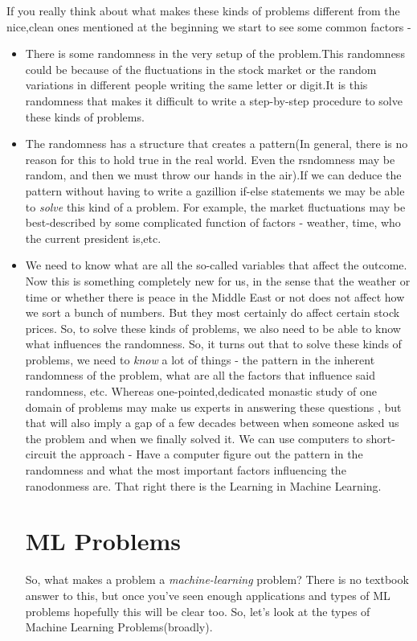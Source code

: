 \documentclass[]{article}
\begin{document}
\begin{itemize}
		If you really think about what makes these kinds of problems different from the nice,clean ones mentioned at the beginning we start to see some common factors - 
		\begin{itemize}
			\item There is some randomness in the very setup of the problem.This randomness could be because of the fluctuations in the stock market or the random variations in different people writing the same letter or digit.It is this randomness that makes it difficult to write a step-by-step procedure to solve these kinds of problems.
			\item The randomness has a structure that creates a pattern(In general, there is no reason for this to hold true in the real world. Even the rsndomness may be random, and then we must throw our hands in the air).If we can deduce the pattern without having to write a gazillion if-else statements we may be able to \textit{solve} this kind of a problem. For example, the market fluctuations may be best-described by some complicated function of factors - weather, time, who the current president is,etc.
			\item We need to know what are all the so-called variables that affect the outcome. Now this is something completely new for us, in the sense that the weather or time or whether there is peace in the Middle East or not does not affect how we sort a bunch of numbers. But they most certainly do affect certain stock prices. So, to solve these kinds of problems, we also need to be able to know what influences the randomness.
			So, it turns out that to solve these kinds of problems, we need to \textit{know} a lot of things - the pattern in the inherent randomness of the problem, what are all the factors that influence said randomness, etc. Whereas one-pointed,dedicated monastic study of one domain of problems may make us experts in answering these questions , but that will also imply a gap of a few decades between when someone asked us the problem and when we finally solved it. We can use computers to short-circuit the approach - Have a computer figure out the pattern in the randomness and what the most important factors influencing the ranodonmess are. That right there is the Learning in Machine Learning.
			\section{ML Problems}
			
			So, what makes a problem a \textit{machine-learning} problem? There is no textbook answer to this, but once you've seen enough applications and types of ML problems hopefully this will be clear too. So, let's look at the types of Machine Learning Problems(broadly).

\end{itemize}
\end{itemize}
\end{document}

